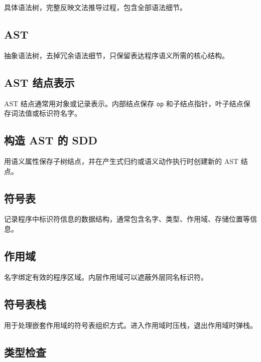 \documentclass[UTF8,zihao=-4]{ctexart}
\begin{document}
具体语法树，完整反映文法推导过程，包含全部语法细节。

\subsection*{AST}

抽象语法树，去掉冗余语法细节，只保留表达程序语义所需的核心结构。

\subsection*{AST 结点表示}

AST 结点通常用对象或记录表示。内部结点保存 \texttt{op} 和子结点指针，叶子结点保存词法值或标识符名字。

\subsection*{构造 AST 的 SDD}

用语义属性保存子树结点，并在产生式归约或语义动作执行时创建新的 AST 结点。

\subsection*{符号表}

记录程序中标识符信息的数据结构，通常包含名字、类型、作用域、存储位置等信息。

\subsection*{作用域}

名字绑定有效的程序区域。内层作用域可以遮蔽外层同名标识符。

\subsection*{符号表栈}

用于处理嵌套作用域的符号表组织方式。进入作用域时压栈，退出作用域时弹栈。

\subsection*{类型检查}
\end{document}
